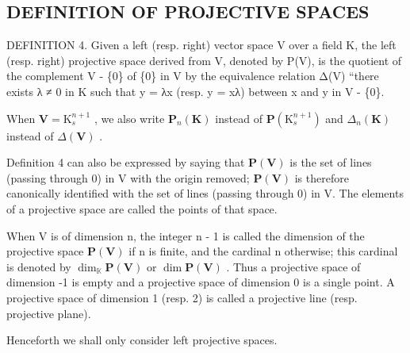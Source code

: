 \subsection{DEFINITION OF PROJECTIVE SPACES}

DEFINITION 4. Given a left (resp. right) vector space V over a field K, the left (resp. right) projective space derived from V, denoted by P(V), is the quotient of the complement V - \{0\} of \{0\} in V by the equivalence relation Δ(V) ``there exists λ ≠ 0 in K such that y = λx (resp. y = xλ) between x and y in V - \{0\}.

When \(\mathbf{V} = \mathrm{K}_s^{n + 1}\) , we also write \(\mathbf{P}_n(\mathbf{K})\) instead of \(\mathbf{P}(\mathrm{K}_s^{n + 1})\) and \(\Delta_n(\mathbf{K})\) instead of \(\Delta (\mathbf{V})\) .

Definition 4 can also be expressed by saying that \(\mathbf{P}(\mathbf{V})\) is the set of lines (passing through 0) in V with the origin removed; \(\mathbf{P}(\mathbf{V})\) is therefore canonically identified with the set of lines (passing through 0) in V. The elements of a projective space are called the points of that space.

When V is of dimension n, the integer n - 1 is called the dimension of the projective space \(\mathbf{P}(\mathbf{V})\) if n is finite, and the cardinal n otherwise; this cardinal is denoted by \(\dim_{\mathbb{K}} \mathbf{P}(\mathbf{V})\) or \(\dim \mathbf{P}(\mathbf{V})\) . Thus a projective space of dimension -1 is empty and a projective space of dimension 0 is a single point. A projective space of dimension 1 (resp. 2) is called a projective line (resp. projective plane).

Henceforth we shall only consider left projective spaces.

